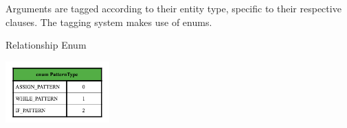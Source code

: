 \documentclass[12pt]{article}
\begin{document}
{{{{{{{{{{Arguments are tagged according to their entity type, specific to their respective clauses. The tagging system makes use of enums. \newline

\begin{table}[htbp]
  \caption{Relationship Enum}
 \includegraphics[width=0.3\textwidth]{Pattern_Enum.png}

\end{table}}}}}}}}}}}
\end{document}
